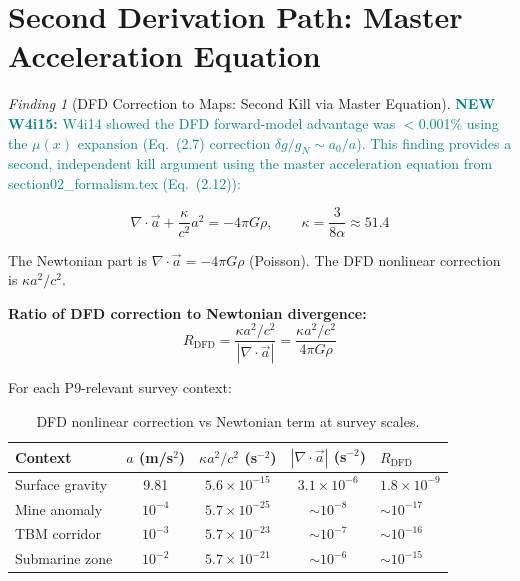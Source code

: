 \documentclass[11pt]{article}
\theoremstyle{definition}
\theoremstyle{remark}
\newtheorem{finding}[theorem]{Finding}
\newcommand{\ee}[1]{\times10^{#1}}
\newcommand{\newfinding}[1]{\textcolor{teal}{\textbf{NEW W4i15:} #1}}
\begin{document}
\section{Second Derivation Path: Master Acceleration Equation}
\label{sec:dfd-mapping-second-kill}

\begin{finding}[DFD Correction to Maps: Second Kill via Master Equation]
\label{find:dfd-mapping-dead}
\newfinding{W4i14 showed the DFD forward-model advantage was $<$0.001\%
using the $\mu(x)$ expansion (Eq.~(2.7) correction $\delta g/g_N \sim
a_0/a$). This finding provides a second, independent kill argument
using the master acceleration equation from section02\_formalism.tex
(Eq.~(2.12)):}

\begin{equation}
\nabla\cdot\vec{a} + \frac{\kappa}{c^2}a^2 = -4\pi G\rho,
\qquad \kappa = \frac{3}{8\alpha} \approx 51.4
\label{eq:master}
\end{equation}

The Newtonian part is $\nabla\cdot\vec{a} = -4\pi G\rho$ (Poisson).
The DFD nonlinear correction is $\kappa a^2/c^2$.

\textbf{Ratio of DFD correction to Newtonian divergence:}
\begin{equation}
R_{\mathrm{DFD}} = \frac{\kappa a^2/c^2}{|\nabla\cdot\vec{a}|}
= \frac{\kappa a^2/c^2}{4\pi G\rho}
\end{equation}

For each P9-relevant survey context:

\begin{table}[H]
\centering
\caption{DFD nonlinear correction vs Newtonian term at survey scales.}
\label{tab:master-correction}
\begin{tabular}{@{}lcccl@{}}
\toprule
Context & $a$ (m/s$^2$) & $\kappa a^2/c^2$ (s$^{-2}$) &
  $|\nabla\cdot\vec{a}|$ (s$^{-2}$) & $R_{\mathrm{DFD}}$ \\
\midrule
Surface gravity & 9.81 & $5.6\ee{-15}$ & $3.1\ee{-6}$ & $1.8\ee{-9}$ \\
Mine anomaly & $10^{-4}$ & $5.7\ee{-25}$ & $\sim 10^{-8}$ & $\sim 10^{-17}$ \\
TBM corridor & $10^{-3}$ & $5.7\ee{-23}$ & $\sim 10^{-7}$ & $\sim 10^{-16}$ \\
Submarine zone & $10^{-2}$ & $5.7\ee{-21}$ & $\sim 10^{-6}$ & $\sim 10^{-15}$ \\
\bottomrule
\end{tabular}
\end{table}


\end{finding}
\end{document}
